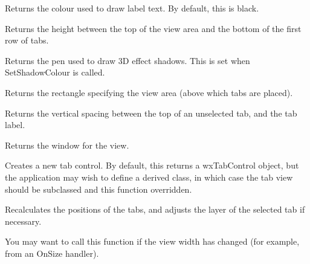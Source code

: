 

Returns the colour used to draw label text. By default, this is
black.



Returns the height between the top of the view area and the bottom of the first
row of tabs.



Returns the pen used to draw 3D effect shadows. This is set when
SetShadowColour is called. 



Returns the rectangle specifying the view area (above which tabs are
placed).



Returns the vertical spacing between the top of an unselected tab, and the tab label.



Returns the window for the view.



Creates a new tab control. By default, this returns a wxTabControl object, but the application may wish
to define a derived class, in which case the tab view should be subclassed and this function overridden.



Recalculates the positions of the tabs, and adjusts the layer of the selected tab if necessary.

You may want to call this function if the view width has changed (for example, from an OnSize handler).



